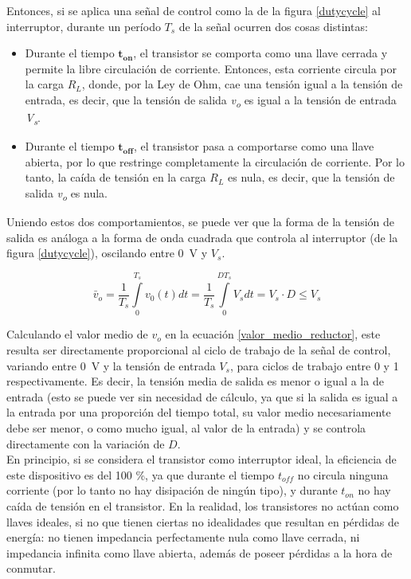Entonces, si se aplica una señal de control como la de la figura \ref{dutycycle} al interruptor, durante un período $T_s$ de la señal ocurren dos cosas distintas:

\begin{itemize}
    \item {\SemiBold Durante el tiempo $\mathbf{t_{on}}$}, el transistor se comporta como una llave cerrada y permite la libre circulación de corriente. Entonces, esta corriente circula por la carga $R_L$, donde, por la Ley de Ohm, cae una tensión igual a la tensión de entrada, es decir, que la tensión de salida {\Medium \textit{v\textsubscript{o}} es igual a la tensión de entrada \textit{V\textsubscript{s}}}.
    \item {\SemiBold Durante el tiempo $\mathbf{t_{off}}$}, el transistor pasa a comportarse como una llave abierta, por lo que restringe completamente la circulación de corriente. Por lo tanto, la caída de tensión en la carga $R_L$ es nula, es decir, que la tensión de salida {\Medium \textit{v\textsubscript{o}} es nula}.
\end{itemize}

Uniendo estos dos comportamientos, se puede ver que la forma de la tensión de salida es análoga a la forma de onda cuadrada que controla al interruptor (de la figura \ref{dutycycle}), oscilando entre \SI{0}{\volt} y $V_s$.

\begin{equation}\label{valor_medio_reductor}
    \bar{v}_o = \frac{1}{T_s}\int\limits^{T_s}_0 v_0(t) dt = \frac{1}{T_s}\int\limits^{DT_s}_0 V_s dt = V_s\cdot D \leq V_s
\end{equation}

Calculando el valor medio de $v_o$ en la ecuación \ref{valor_medio_reductor}, este resulta ser directamente proporcional al ciclo de trabajo de la señal de control, variando entre \SI[]{0}[]{\volt} y la tensión de entrada $V_s$, para ciclos de trabajo entre \num{0} y \num{1} respectivamente. Es decir, la {\Medium tensión media de salida es menor o igual a la de entrada} (esto se puede ver sin necesidad de cálculo, ya que si la salida es igual a la entrada por una proporción del tiempo total, su valor medio necesariamente debe ser menor, o como mucho igual, al valor de la entrada) y se controla directamente con la variación de $D$.\\

En principio, si se considera el transistor como interruptor ideal, la eficiencia de este dispositivo es del 100 \%, ya que durante el tiempo $t_{off}$ no circula ninguna corriente (por lo tanto no hay disipación de ningún tipo), y durante $t_{on}$ no hay caída de tensión en el transistor. En la realidad, los transistores no actúan como llaves ideales, si no que tienen ciertas no idealidades que resultan en pérdidas de energía: no tienen impedancia perfectamente nula como llave cerrada, ni impedancia infinita como llave abierta, además de poseer pérdidas a la hora de conmutar.\\

